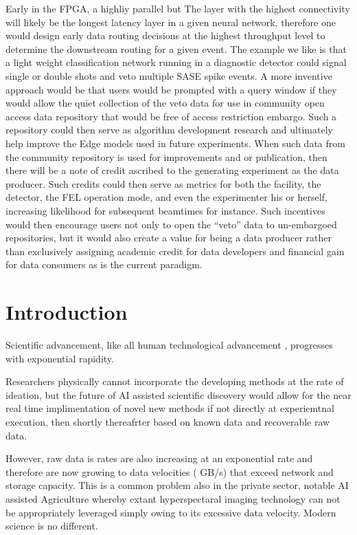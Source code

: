 \documentclass{article}
\begin{document}
Early in the FPGA, a highliy parallel but 
The layer with the highest connectivity will likely be the longest latency layer in a given neural network, therefore one would design early data routing decisions at the highest throughput level to determine the downstream routing for a given event.  
The example we like is that a light weight classification network running in a diagnostic detector could signal single or double shots and veto multiple SASE spike events.
A more inventive approach would be that users would be prompted with a query window if they would allow the quiet collection of the veto data for use in community open access data repository that would be free of access restriction embargo.
Such a repository could then serve as algorithm development research and ultimately help improve the Edge models used in future experiments.
When such data from the community repository is used for improvements and or publication, then there will be a note of credit ascribed to the generating experiment as the data producer.
Such credits could then serve as metrics for both the facility, the detector, the FEL operation mode, and even the experimenter his or herself, increasing likelihood for subsequent beamtimes for instance.
Such incentives would then encourage users not only to open the ``veto'' data to un-embargoed repositories, but it would also create a value for being a data producer rather than exclusively assigning academic credit for data developers and financial gain for data consumers as is the current paradigm.




\section{Introduction}
Scientific advancement, like all human technological advancement \cite{Kurzweil}, progresses with exponential rapidity.

Researchers physically cannot incorporate the developing methods at the rate of ideation, but the future of AI assisted scientific discovery would allow for the near real time implimentation of novel new methods if not directly at experiemtnal execution, then shortly thereafrter based on known data and recoverable raw data.

However, raw data is rates are also increasing at an exponential rate and therefore are now growing to data velocities ( GB/s) that exceed network and storage capacity.  This is a common problem also in the private sector, notable AI assisted Agriculture whereby extant hyperspectaral imaging technology can not be appropriately leveraged simply owing to its excessive data velocity.
Modern science is no different.
\end{document}
